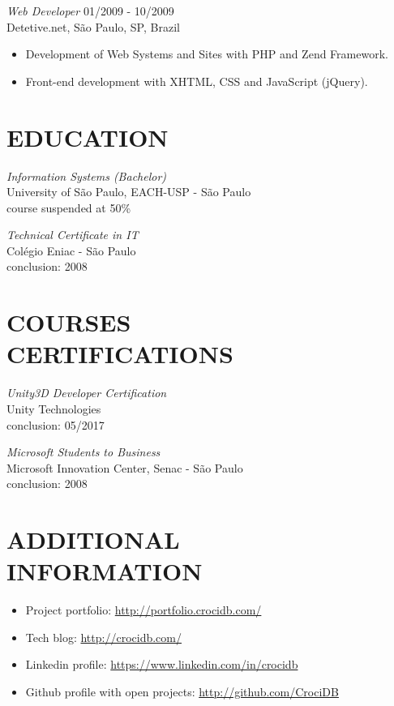 \documentclass[line,margin]{res}
\begin{document}
\begin{resume}
                {\sl Web Developer} \hfill 01/2009 - 10/2009 \\
                Detetive.net, São Paulo, SP, Brazil
                 \begin{itemize}  \itemsep 1.25pt
                 \item Development of Web Systems and Sites with PHP and Zend Framework.
                 \item Front-end development with XHTML, CSS and JavaScript (jQuery).
                 \end{itemize} 

\section{EDUCATION} {\sl Information Systems (Bachelor)} \\
                University of São Paulo, EACH-USP - São Paulo \\
                course suspended at 50\%
		
			{\sl Technical Certificate in IT} \\
	            Colégio Eniac - São Paulo \\
	            conclusion: 2008
                
\section{COURSES \\ CERTIFICATIONS}   
           {\sl Unity3D Developer Certification} \\
                Unity Technologies \\
			    conclusion: 05/2017
			
           {\sl Microsoft Students to Business} \\
                Microsoft Innovation Center, Senac - São Paulo \\
                conclusion: 2008 

\section{ADDITIONAL \\ INFORMATION}
            \begin{itemize}  \itemsep 1pt
	    	\item Project portfolio: \href{http://portfolio.crocidb.com/}{http://portfolio.crocidb.com/}
	    	\item Tech blog: \href{http://crocidb.com/}{http://crocidb.com/}
            \item Linkedin profile: \href{https://www.linkedin.com/in/crocidb}{https://www.linkedin.com/in/crocidb}
            \item Github profile with open projects: \href{http://github.com/CrociDB}{http://github.com/CrociDB}
            \end{itemize} 

\end{resume}
\end{document}
